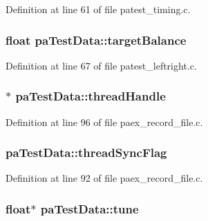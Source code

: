 Definition at line 61 of file patest\+\_\+timing.\+c.

\subsubsection[{\texorpdfstring{target\+Balance}{targetBalance}}]{\setlength{\rightskip}{0pt plus 5cm}float pa\+Test\+Data\+::target\+Balance}\hypertarget{structpa_test_data_a09a1cfcd06bdf30d85b81784e7df867f}{}\label{structpa_test_data_a09a1cfcd06bdf30d85b81784e7df867f}


Definition at line 67 of file patest\+\_\+leftright.\+c.

\subsubsection[{\texorpdfstring{thread\+Handle}{threadHandle}}]{$\ast$ pa\+Test\+Data\+::thread\+Handle}\hypertarget{structpa_test_data_ab036844d2e7ac2e13fd18b3b8ffaa276}{}\label{structpa_test_data_ab036844d2e7ac2e13fd18b3b8ffaa276}


Definition at line 96 of file paex\+\_\+record\+\_\+file.\+c.

\subsubsection[{\texorpdfstring{thread\+Sync\+Flag}{threadSyncFlag}}]{ pa\+Test\+Data\+::thread\+Sync\+Flag}\hypertarget{structpa_test_data_a32b63eb4dea8079ebf95cb5936ff6085}{}\label{structpa_test_data_a32b63eb4dea8079ebf95cb5936ff6085}


Definition at line 92 of file paex\+\_\+record\+\_\+file.\+c.

\subsubsection[{\texorpdfstring{tune}{tune}}]{\setlength{\rightskip}{0pt plus 5cm}float$\ast$ pa\+Test\+Data\+::tune}\hypertarget{structpa_test_data_a3881ecb8fcbb56ec522c9d8451feda9a}{}\label{structpa_test_data_a3881ecb8fcbb56ec522c9d8451feda9a}


